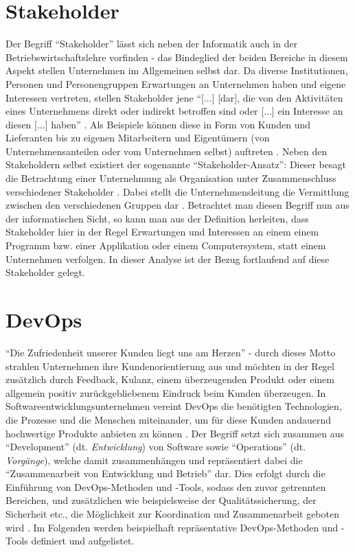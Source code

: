 \section{Stakeholder}
Der Begriff \enquote{Stakeholder} lässt sich neben der Informatik auch in der Betriebswirtschaftslehre vorfinden - das Bindeglied der beiden Bereiche in diesem Aspekt stellen Unternehmen im Allgemeinen selbst dar.
Da diverse Institutionen, Personen und Personengruppen Erwartungen an Unternehmen haben und eigene Interessen vertreten, stellen Stakeholder jene \enquote{[...] [dar], die von den Aktivitäten eines Unternehmens 
direkt oder indirekt betroffen sind oder [...] ein Interesse an diesen [...] haben} \cite{Fleig:2016aa}. Als Beispiele können diese in Form von Kunden und Lieferanten bis zu eigenen Mitarbeitern und Eigentümern (von 
Unternehmensanteilen oder vom Unternehmen selbst) auftreten \cite{Fleig:2016aa}. \newline Neben den Stakeholdern selbst existiert der sogenannte \enquote{Stakeholder-Ansatz}: Dieser besagt die Betrachtung einer Unternehmung
als Organisation unter Zusammenschluss verschiedener Stakeholder \cite{Seyfriedt:2018aa}. Dabei stellt die Unternehmensleitung die Vermittlung zwischen den verschiedenen Gruppen dar \cite{Seyfriedt:2018aa}. \newline
Betrachtet man diesen Begriff nun aus der informatischen Sicht, so kann man aus der Definition herleiten, dass Stakeholder hier in der Regel Erwartungen und Interessen an einem einem Programm bzw. einer Applikation oder einem 
Computersystem, statt einem Unternehmen verfolgen. \newline \newline In dieser Analyse ist der Bezug fortlaufend auf diese Stakeholder gelegt.

\section{DevOps}
\enquote{Die Zufriedenheit unserer Kunden liegt uns am Herzen} - durch dieses Motto strahlen Unternehmen ihre Kundenorientierung aus und möchten in der Regel zusätzlich durch Feedback, Kulanz, einem überzeugenden Produkt
oder einem allgemein positiv zurückgebliebenem Eindruck beim Kunden überzeugen. In Softwareentwicklungsunternehmen vereint DevOps die benötigten Technologien, die Prozesse und die Menschen miteinander, um für diese Kunden 
andauernd hochwertige Produkte anbieten zu können \cite{MSAzure:2020aa}. Der Begriff setzt sich zusammen aus \enquote{Development} (dt. \textit{Entwicklung}) von Software sowie \enquote{Operations} (dt. \textit{Vorgänge}), welche damit zusammenhängen 
\cite{MSAzure:2020aa} und repräsentiert dabei die \enquote{Zusammenarbeit von Entwicklung und Betrieb} \cite{Hasselbring:2015aa} dar. Dies erfolgt durch die Einführung von DevOps-Methoden und -Tools, sodass den zuvor getrennten Bereichen, 
und zusätzlichen wie beispielsweise der Qualitätssicherung, der Sicherheit etc., die Möglichkeit zur Koordination und Zusammenarbeit geboten wird \cite{MSAzure:2020aa}. \newline \newline
Im Folgenden werden beispielhaft repräsentative DevOps-Methoden und -Tools definiert und aufgelistet.

